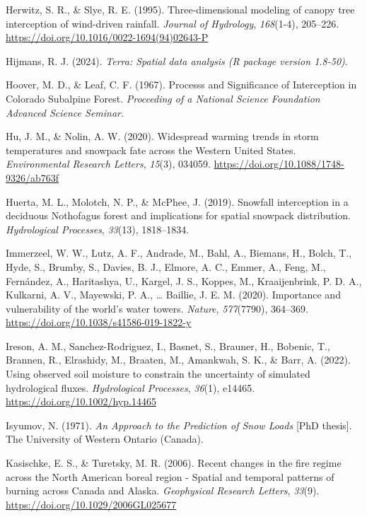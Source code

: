 \documentclass[
  letterpaper,
]{tex/uofsthesis-cs}
\newlength{\cslhangindent}
\newenvironment{CSLReferences}[2] %
 {\begin{list}{}{%
  \setlength{\itemindent}{0pt}
  \setlength{\leftmargin}{0pt}
  \setlength{\parsep}{0pt}
  \ifodd #1
   \setlength{\leftmargin}{\cslhangindent}
   \setlength{\itemindent}{-1\cslhangindent}
  \fi
  \setlength{\itemsep}{#2\baselineskip}}}
 {\end{list}}
\begin{document}
\begin{CSLReferences}{1}{0}
Herwitz, S. R., \& Slye, R. E. (1995). Three-dimensional modeling of
canopy tree interception of wind-driven rainfall. \emph{Journal of
Hydrology}, \emph{168}(1-4), 205--226.
\url{https://doi.org/10.1016/0022-1694(94)02643-P}

Hijmans, R. J. (2024). \emph{Terra: {Spatial} data analysis ({R} package
version 1.8-50)}.

Hoover, M. D., \& Leaf, C. F. (1967). Processs and {Significance} of
{Interception} in {Colorado Subalpine Forest}. \emph{Proceeding of a
{National Science Foundation Advanced Science Seminar}}.

Hu, J. M., \& Nolin, A. W. (2020). Widespread warming trends in storm
temperatures and snowpack fate across the {Western United States}.
\emph{Environmental Research Letters}, \emph{15}(3), 034059.
\url{https://doi.org/10.1088/1748-9326/ab763f}

Huerta, M. L., Molotch, N. P., \& McPhee, J. (2019). Snowfall
interception in a deciduous {Nothofagus} forest and implications for
spatial snowpack distribution. \emph{Hydrological Processes},
\emph{33}(13), 1818--1834.

Immerzeel, W. W., Lutz, A. F., Andrade, M., Bahl, A., Biemans, H.,
Bolch, T., Hyde, S., Brumby, S., Davies, B. J., Elmore, A. C., Emmer,
A., Feng, M., Fernández, A., Haritashya, U., Kargel, J. S., Koppes, M.,
Kraaijenbrink, P. D. A., Kulkarni, A. V., Mayewski, P. A., \ldots{}
Baillie, J. E. M. (2020). Importance and vulnerability of the world's
water towers. \emph{Nature}, \emph{577}(7790), 364--369.
\url{https://doi.org/10.1038/s41586-019-1822-y}

Ireson, A. M., Sanchez-Rodriguez, I., Basnet, S., Brauner, H., Bobenic,
T., Brannen, R., Elrashidy, M., Braaten, M., Amankwah, S. K., \& Barr,
A. (2022). Using observed soil moisture to constrain the uncertainty of
simulated hydrological fluxes. \emph{Hydrological Processes},
\emph{36}(1), e14465. \url{https://doi.org/10.1002/hyp.14465}

Isyumov, N. (1971). \emph{An {Approach} to the {Prediction} of {Snow
Loads}} {[}PhD thesis{]}. The University of Western Ontario (Canada).

Kasischke, E. S., \& Turetsky, M. R. (2006). Recent changes in the fire
regime across the {North American} boreal region - {Spatial} and
temporal patterns of burning across {Canada} and {Alaska}.
\emph{Geophysical Research Letters}, \emph{33}(9).
\url{https://doi.org/10.1029/2006GL025677}


\end{CSLReferences}
\end{document}

